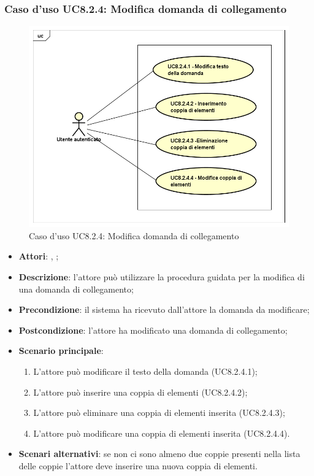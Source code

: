 \subsubsection{Caso d'uso UC8.2.4: Modifica domanda di collegamento}
\label{UC8.2.4}
\begin{figure}[ht]
	\centering
	\includegraphics[scale=0.5,keepaspectratio]{UML/UC8_2_4.png}
	\caption{Caso d'uso UC8.2.4: Modifica domanda di collegamento}
\end{figure}
\FloatBarrier
\begin{itemize}
	\item \textbf{Attori}: \uau, \uaupro;
	\item \textbf{Descrizione}: l'attore può utilizzare la procedura guidata per la modifica di una domanda di collegamento; 
	\item \textbf{Precondizione}: il sistema ha ricevuto dall'attore la domanda da modificare; 
	\item \textbf{Postcondizione}: l'attore ha modificato una domanda di collegamento;
	\item \textbf{Scenario principale}: 
	\begin{enumerate}
			\item L'attore può modificare il testo della domanda (UC8.2.4.1);
			\item L'attore può inserire una coppia di elementi (UC8.2.4.2);
			\item L'attore può eliminare una coppia di elementi inserita (UC8.2.4.3);
			\item L'attore può modificare una coppia di elementi inserita (UC8.2.4.4).
		\end{enumerate}
	\item \textbf{Scenari alternativi}: se non ci sono almeno due coppie presenti nella lista delle coppie l'attore deve inserire una nuova coppia di elementi.
\end{itemize}

